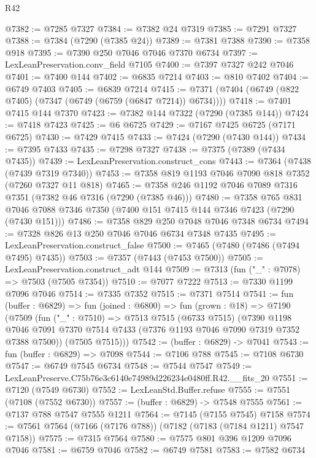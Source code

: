 \begin{lexlean}{R42}
\begin{coremodule}
{@7382 := @7285 @7327
@7384 := @7382 @24 @7319
@7385 := @7291 @7327
@7388 := @7384 (@7290 (@7385 @24))
@7389 := @7381 @7388
@7390 := @7358 @918
@7395 := @7390 @250 @7046 @7046 @7370 @6734
@7397 := LexLeanPreservation.conv_field @7105
@7400 := @7397 @7327 @242 @7046
@7401 := @7400 @144
@7402 := @6835 @7214
@7403 := @810 @7402
@7404 := @6749 @7403
@7405 := @6839 @7214
@7415 := @7371 (@7404 (@6749 (@822 @7405) (@7347 (@6749 (@6759 (@6847 @7214)) @6734))))
@7418 := @7401 @7415 @144 @7370
@7423 := @7382 @144 @7322 (@7290 (@7385 @144))
@7424 := @7418 @7423
@7425 := @6 @6725
@7429 := @7167 @7425 @6725 (@7171 @6725)
@7430 := @7429 @7415
@7433 := @7424 (@7290 (@7430 @144))
@7434 := @7395 @7433
@7435 := @7298 @7327
@7438 := @7375 (@7389 (@7434 @7435))
@7439 := LexLeanPreservation.construct_cons
@7443 := @7364 (@7438 (@7439 @7319 @7340))
@7453 := @7358 @819 @1193 @7046 @7090 @818 @7352 (@7260 @7327 @11 @818)
@7465 := @7358 @246 @1192 @7046 @7089 @7316 @7351 (@7382 @46 @7316 (@7290 (@7385 @46)))
@7480 := @7358
    @765
    @831
    @7046
    @7088
    @7346
    @7350
    (@7400 @151 @7415 @144 @7346 @7423 (@7290 (@7430 @151)))
@7486 := @7358 @829 @250 @7048 @7046 @7348 @6734
@7494 := @7328 @826 @13 @250 @7046 @7046 @6734 @7348 @7435
@7495 := LexLeanPreservation.construct_false
@7500 := @7465 (@7480 (@7486 (@7494 @7495) @7435))
@7503 := @7357 (@7443 (@7453 @7500))
@7505 := LexLeanPreservation.construct_adt @144
@7509 := @7313 (fun ("_" : @7078) => @7503 (@7505 @7354))
@7510 := @7077 @7222
@7513 := @7330 @1199 @7096 @7046
@7514 := @7335 @7352
@7515 := @7371 @7514
@7541 := fun (buffer : @6829) =>
  fun (joined : @6800) =>
  fun (grown : @18) =>
  @7190
    (@7509
      (fun ("_" : @7510) =>
      @7513
        @7515
        (@6733 @7515)
        (@7390
          @1198
          @7046
          @7091
          @7370
          @7514
          @7433
          (@7376 @1193 @7046 @7090 @7319 @7352 @7388 @7500))
        (@7505 @7515)))
@7542 := (buffer : @6829) -> @7041
@7543 := fun (buffer : @6829) => @7098
@7544 := @7106 @788
@7545 := @7108 @6730
@7547 := @6749 @7545 @6734
@7548 := @7544 @7547
@7549 := LexLeanPreserve.C75b76e3c6140e74989d226234e0480ff.R42.__fits_20
@7551 := @7120 (@7549 @6730)
@7552 := LexLeanStd.Buffer.refuse
@7555 := @7551 (@7108 (@7552 @6730))
@7557 := (buffer : @6829) -> @7548 @7555
@7561 := @7137 @788 @7547 @7555 @1211
@7564 := @7145 (@7155 @7545) @7158
@7574 := @7561 @7564 (@7166 (@7176 @788)) (@7182 (@7183 (@7184 @1211) @7547 @7158))
@7575 := @7315 @7564
@7580 := @7575 @801 @396 @1209 @7096 @7046
@7581 := @6759 @7046
@7582 := @6749 @7581
@7583 := @7582 @6734
}
\end{coremodule}
\end{lexlean}
